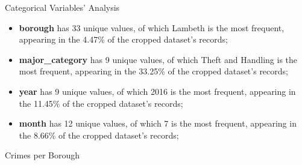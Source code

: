 \documentclass[12pt]{beamer}
\begin{document}
        \begin{frame}{Categorical Variables' Analysis}
            \begin{itemize}
                \item \textbf{borough} has 33 unique values, of which Lambeth is the most frequent,
                appearing in the 4.47\% of the cropped dataset's records;
                \item \textbf{major\_category} has 9 unique values, of which Theft and Handling is the most
                frequent, appearing in the 33.25\% of the cropped dataset's records;
                \item \textbf{year} has 9 unique values, of which 2016 is the most frequent, appearing in
                the 11.45\% of the cropped dataset's records;
                \item \textbf{month} has 12 unique values, of which 7 is the most frequent, appearing in the
                8.66\% of the cropped dataset's records;
            \end{itemize}
        \end{frame}

        \begin{frame}{Crimes per Borough}
            \begin{figure}
                \centering
            \end{figure}
        \end{frame}
\end{document}
